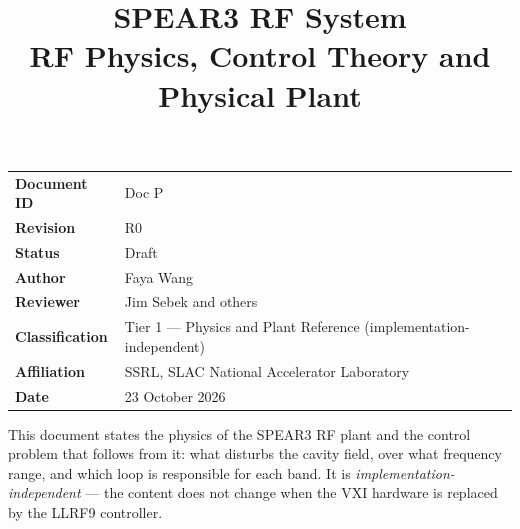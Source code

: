 \documentclass[letterpaper,11pt]{article}
\title{\vspace{-1.4cm}\bfseries SPEAR3 RF System\\[2mm]
       \Large RF Physics, Control Theory and Physical Plant}
\author{}
\date{}
\numberwithin{equation}{section}
\begin{document}
\maketitle
\thispagestyle{plain}

\begin{center}
\begin{minipage}{0.86\linewidth}\small
\begin{tabular}{@{}ll@{}}
\textbf{Document ID} & Doc P \\
\textbf{Revision}    & R0 \\
\textbf{Status}      & Draft \\
\textbf{Author}      & Faya Wang \\
\textbf{Reviewer}    & Jim Sebek and others \\
\textbf{Classification} & Tier 1 --- Physics and Plant Reference (implementation-independent) \\
\textbf{Affiliation} & SSRL, SLAC National Accelerator Laboratory \\
\textbf{Date}        & 23 October 2026 \\
\end{tabular}
\end{minipage}
\end{center}

\vspace{4mm}
\begin{keynote}
This document states the physics of the SPEAR3 RF plant and the control problem
that follows from it: what disturbs the cavity field, over what frequency range,
and which loop is responsible for each band. It is
\emph{implementation-independent} --- the content does not change when the VXI
hardware is replaced by the LLRF9 controller.
\end{keynote}

\clearpage
\tableofcontents
\clearpage
\listoffigures
\clearpage


\end{document}

